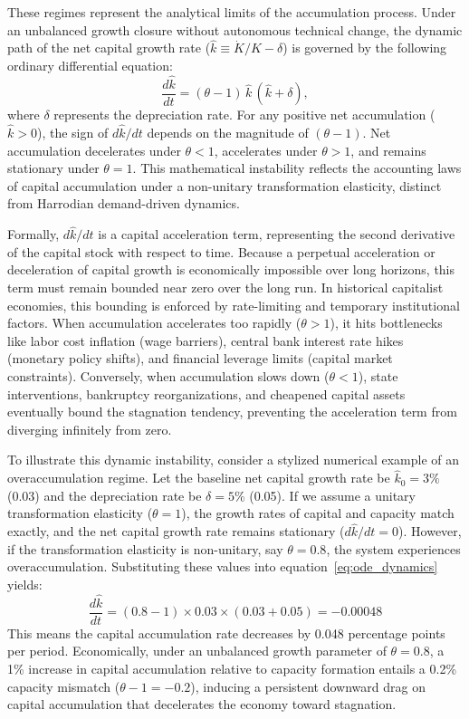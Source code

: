 \documentclass[11pt]{article}
\begin{document}
These regimes represent the analytical limits of the accumulation process. Under an unbalanced growth closure without autonomous technical change, the dynamic path of the net capital growth rate ($\hat{k} \equiv \dot{K}/K - \delta$) is governed by the following ordinary differential equation:
\begin{equation}
\label{eq:ode_dynamics}
\frac{d\hat{k}}{dt} = (\theta - 1)\,\hat{k}\,(\hat{k}+\delta),
\end{equation}
where $\delta$ represents the depreciation rate. For any positive net accumulation ($\hat{k} > 0$), the sign of $d\hat{k}/dt$ depends on the magnitude of $(\theta - 1)$. Net accumulation decelerates under $\theta < 1$, accelerates under $\theta > 1$, and remains stationary under $\theta = 1$. This mathematical instability reflects the accounting laws of capital accumulation under a non-unitary transformation elasticity, distinct from Harrodian demand-driven dynamics.

Formally, $d\hat{k}/dt$ is a capital acceleration term, representing the second derivative of the capital stock with respect to time. Because a perpetual acceleration or deceleration of capital growth is economically impossible over long horizons, this term must remain bounded near zero over the long run. In historical capitalist economies, this bounding is enforced by rate-limiting and temporary institutional factors. When accumulation accelerates too rapidly ($\theta > 1$), it hits bottlenecks like labor cost inflation (wage barriers), central bank interest rate hikes (monetary policy shifts), and financial leverage limits (capital market constraints). Conversely, when accumulation slows down ($\theta < 1$), state interventions, bankruptcy reorganizations, and cheapened capital assets eventually bound the stagnation tendency, preventing the acceleration term from diverging infinitely from zero.

To illustrate this dynamic instability, consider a stylized numerical example of an overaccumulation regime. Let the baseline net capital growth rate be $\hat{k}_0 = 3\%$ (0.03) and the depreciation rate be $\delta = 5\%$ (0.05). If we assume a unitary transformation elasticity ($\theta = 1$), the growth rates of capital and capacity match exactly, and the net capital growth rate remains stationary ($d\hat{k}/dt = 0$). However, if the transformation elasticity is non-unitary, say $\theta = 0.8$, the system experiences overaccumulation. Substituting these values into equation~\eqref{eq:ode_dynamics} yields:
\[\frac{d\hat{k}}{dt} = (0.8 - 1) \times 0.03 \times (0.03 + 0.05) = -0.00048\]
This means the capital accumulation rate decreases by 0.048 percentage points per period. Economically, under an unbalanced growth parameter of $\theta = 0.8$, a 1\% increase in capital accumulation relative to capacity formation entails a 0.2\% capacity mismatch ($\theta - 1 = -0.2$), inducing a persistent downward drag on capital accumulation that decelerates the economy toward stagnation.
\end{document}
